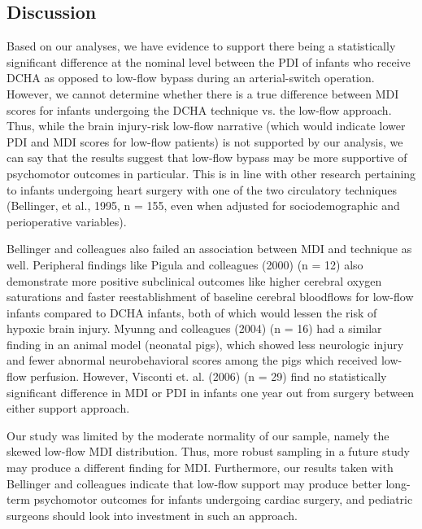 \documentclass{article}
\begin{document}
\begin{enumerate}
		\subsection*{Discussion}
		Based on our analyses, we have evidence to support there being a statistically significant difference at the nominal level between the PDI of infants who receive DCHA as opposed to low-flow bypass during an arterial-switch operation. However, we cannot determine whether there is a true difference between MDI scores for infants undergoing the DCHA technique vs. the low-flow approach. Thus, while the brain injury-risk low-flow narrative (which would indicate lower PDI and MDI scores for low-flow patients) is not supported by our analysis, we can say that the results suggest that low-flow bypass may be more supportive of psychomotor outcomes in particular. This is in line with other research pertaining to infants undergoing heart surgery with one of the two circulatory techniques (Bellinger, et al., 1995, n = 155, even when adjusted for sociodemographic and perioperative variables).

		Bellinger and colleagues also failed an association between MDI and technique as well. Peripheral findings like Pigula and colleagues (2000) (n = 12) also demonstrate more positive subclinical outcomes like higher cerebral oxygen saturations and faster reestablishment of baseline cerebral bloodflows for low-flow infants compared to DCHA infants, both of which would lessen the risk of hypoxic brain injury. Myunng and colleagues (2004) (n = 16) had a similar finding in an animal model (neonatal pigs), which showed less neurologic injury and fewer abnormal neurobehavioral scores among the pigs which received low-flow perfusion. However, Visconti et. al. (2006) (n = 29) find no statistically significant difference in MDI or PDI in infants one year out from surgery between either support approach. 
		
		Our study was limited by the moderate normality of our sample, namely the skewed low-flow MDI distribution. Thus, more robust sampling in a future study may produce a different finding for MDI. Furthermore, our results taken with Bellinger and colleagues indicate that low-flow support may produce better long-term psychomotor outcomes for infants undergoing cardiac surgery, and pediatric surgeons should look into investment in such an approach.
		

			
			
			
			
			
			
			
		
	\end{enumerate}
		
\end{document}
